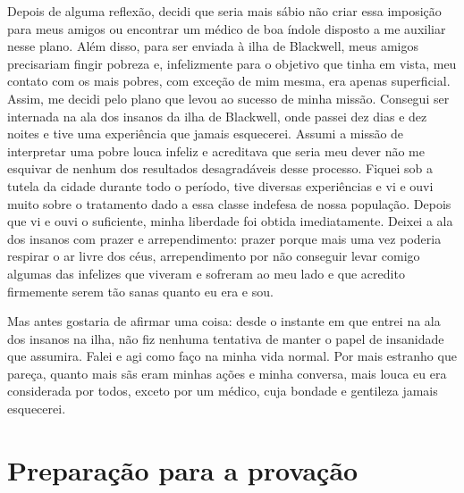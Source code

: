 Depois
de alguma reflexão, decidi que seria mais sábio não criar essa imposição
para meus amigos ou encontrar um médico de boa índole disposto a me
auxiliar nesse plano. Além disso, para ser enviada à ilha de Blackwell,
meus amigos precisariam fingir pobreza e, infelizmente para o objetivo
que tinha em vista, meu contato com os mais pobres, com exceção de mim
mesma, era apenas superficial. Assim, me decidi pelo plano que levou ao
sucesso de minha missão. Consegui ser internada na ala dos insanos da
ilha de Blackwell, onde passei dez dias e dez noites e tive uma
experiência que jamais esquecerei. Assumi a missão de interpretar uma
pobre louca infeliz e acreditava que seria meu dever não me esquivar de
nenhum dos resultados desagradáveis desse processo. Fiquei sob a tutela
da cidade durante todo o período, tive diversas experiências e vi e ouvi
muito sobre o tratamento dado a essa classe indefesa de nossa população.
Depois que vi e ouvi o suficiente, minha liberdade foi obtida
imediatamente. Deixei a ala dos insanos com prazer e arrependimento:
prazer porque mais uma vez poderia respirar o ar livre dos céus,
arrependimento por não conseguir levar comigo algumas das infelizes que
viveram e sofreram ao meu lado e que acredito firmemente serem tão sanas
quanto eu era e sou.

Mas antes gostaria de afirmar uma coisa: desde o instante em que entrei
na ala dos insanos na ilha, não fiz nenhuma tentativa de manter o papel
de insanidade que assumira. Falei e agi como faço na minha vida normal.
Por mais estranho que pareça, quanto mais sãs eram minhas ações e minha
conversa, mais louca eu era considerada por todos, exceto por um médico,
cuja bondade e gentileza jamais esquecerei.


\chapter{Preparação para a
provação}\label{capuxedtulo-ii-preparauxe7uxe3o-para-a-provauxe7uxe3o}

